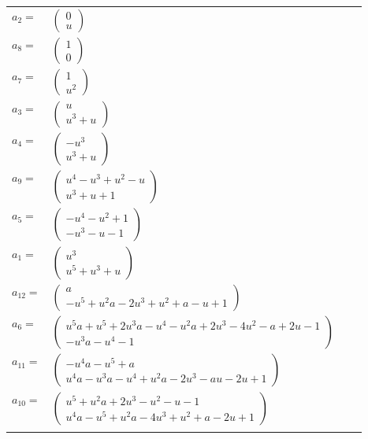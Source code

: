 \documentclass[1p]{elsarticle_modified}
\theoremstyle{definition}
\begin{document}
\begin{tabular}{m{7pt} m{180pt} m{7pt} m{180pt} }
\flushright $a_{2}=$&$\begin{pmatrix}0\\u\end{pmatrix}$ \\
\flushright $a_{8}=$&$\begin{pmatrix}1\\0\end{pmatrix}$ \\
\flushright $a_{7}=$&$\begin{pmatrix}1\\u^2\end{pmatrix}$ \\
\flushright $a_{3}=$&$\begin{pmatrix}u\\u^3+u\end{pmatrix}$ \\
\flushright $a_{4}=$&$\begin{pmatrix}- u^3\\u^3+u\end{pmatrix}$ \\
\flushright $a_{9}=$&$\begin{pmatrix}u^4- u^3+u^2- u\\u^3+u+1\end{pmatrix}$ \\
\flushright $a_{5}=$&$\begin{pmatrix}- u^4- u^2+1\\- u^3- u-1\end{pmatrix}$ \\
\flushright $a_{1}=$&$\begin{pmatrix}u^3\\u^5+u^3+u\end{pmatrix}$ \\
\flushright $a_{12}=$&$\begin{pmatrix}a\\- u^5+u^2 a-2 u^3+u^2+a- u+1\end{pmatrix}$ \\
\flushright $a_{6}=$&$\begin{pmatrix}u^5 a+u^5+2 u^3 a- u^4- u^2 a+2 u^3-4 u^2- a+2 u-1\\- u^3 a- u^4-1\end{pmatrix}$ \\
\flushright $a_{11}=$&$\begin{pmatrix}- u^4 a- u^5+a\\u^4 a- u^3 a- u^4+u^2 a-2 u^3- a u-2 u+1\end{pmatrix}$ \\
\flushright $a_{10}=$&$\begin{pmatrix}u^5+u^2 a+2 u^3- u^2- u-1\\u^4 a- u^5+u^2 a-4 u^3+u^2+a-2 u+1\end{pmatrix}$\\&\end{tabular}
\end{document}

